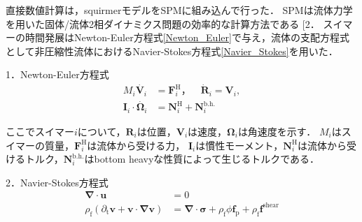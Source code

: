 \documentclass[twocolumns,10pt,a4j]{jarticle}
\makeatletter
\DeclareRobustCommand\cite{\unskip
  \@ifnextchar[{\@tempswatrue\@citex}{\@tempswafalse\@citex[]}}
\makeatother
\begin{document}
直接数値計算は，squirmerモデルをSPMに組み込んで行った．
SPMは流体力学を用いた固体/流体2相ダイナミクス問題の効率的な計算方法である\cite{2}．
スイマーの時間発展はNewton-Euler方程式\eqref{Newton_Euler}で与え，流体の支配方程式として非圧縮性流体におけるNavier-Stokes方程式\eqref{Navier_Stokes}を用いた．

  \par
1．Newton-Euler方程式\\
  \vspace{-6truemm}
  \begin{equation}
    \begin{split}
      M_i \dot{\boldsymbol{V}_i} &= \boldsymbol{F}_i^\mathrm{H}，\quad
      \dot{\boldsymbol{R}}_i = \boldsymbol{V}_i, \\
      \boldsymbol{I}_i \cdot \dot{\boldsymbol{\Omega}_i} &= \boldsymbol{N}_i^\mathrm{H} + \boldsymbol{N}_i^\mathrm{b.h.}
    \end{split}
    \label{Newton_Euler}
  \end{equation}
  \vspace{-4truemm}

  \noindent
ここでスイマー$i$について，$\boldsymbol{R}_i$は位置，$\boldsymbol{V}_i$は速度，$\boldsymbol{\Omega}_i$は角速度を示す．
$M_i$はスイマーの質量，$\boldsymbol{F}_i^\mathrm{H}$は流体から受ける力，
$\boldsymbol{I}_i$は慣性モーメント，$\boldsymbol{N}_i^\mathrm{H}$は流体から受けるトルク，$\boldsymbol{N}_i^\mathrm{b.h.}$はbottom heavyな性質によって生じるトルクである．

  \par
2．Navier-Stokes方程式\\
  \vspace{-6truemm}
  \begin{equation}
    \begin{split}
      \boldsymbol{\nabla}\cdot\boldsymbol{u} &= 0 \\
      \rho_\mathrm{f} \left(\partial_\mathrm{t} \boldsymbol{v} + \boldsymbol{v} \cdot \boldsymbol{\nabla v} \right) &= \boldsymbol{\nabla} \cdot \boldsymbol{\sigma} + \rho_\mathrm{f} \phi \boldsymbol{f}_\mathrm{p} + \rho_\mathrm{f} \boldsymbol{f}^\mathrm{shear}
    \end{split}
    \label{Navier_Stokes}
  \end{equation}
  \vspace{-4truemm}
\end{document}

